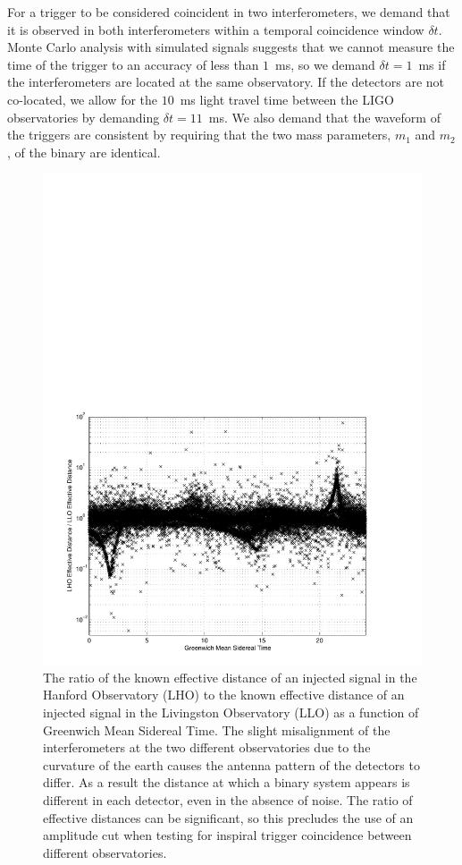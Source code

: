 For a trigger to be considered coincident in two interferometers, we demand
that it is observed in both interferometers within a temporal coincidence
window $\delta t$. Monte Carlo analysis with simulated signals suggests that we
cannot measure the time of the trigger to an accuracy of less than $1$~ms, so
we demand $\delta t = 1$~ms if the interferometers are located at the same
observatory. If the detectors are not co-located, we allow for the $10$~ms
light travel time between the LIGO observatories by demanding $\delta t =
11$~ms. We also demand that the waveform of the triggers are consistent by
requiring that the two mass parameters, $m_1$ and $m_2$, of the binary are
identical.

\begin{figure}
  \vspace{5pt}
  \begin{flushright}
    \includegraphics[width=\textwidth]{gmst_dist_ratio}    
  \end{flushright}
  \caption{%
  The ratio of the known effective distance of an injected signal in the
  Hanford Observatory (LHO) to the known effective distance of an injected
  signal in the Livingston Observatory (LLO) as a function of Greenwich Mean
  Sidereal Time. The slight misalignment of the interferometers at the two
  different observatories due to the curvature of the earth causes the antenna
  pattern of the detectors to differ. As a result the distance at which a
  binary system appears is different in each detector, even in the absence of
  noise.  The ratio of effective distances can be significant, so this
  precludes the use of an amplitude cut when testing for inspiral trigger
  coincidence between different observatories.
  }
\label{f:gmst_dist_ratio}
\end{figure}

